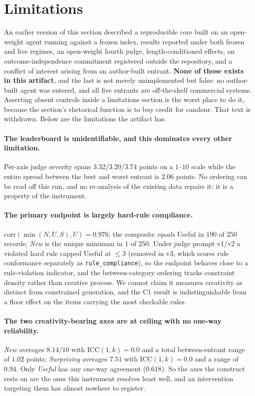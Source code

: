 \section{Limitations}
\label{sec:limitations}

An earlier version of this section described a reproducible core built on an open-weight agent
running against a frozen index, results reported under both frozen and live regimes, an open-weight
fourth judge, length-conditioned effects, an outcome-independence commitment registered outside the
repository, and a conflict of interest arising from an author-built entrant. \textbf{None of those
exists in this artifact}, and the last is not merely unimplemented but false: no author-built agent
was entered, and all five entrants are off-the-shelf commercial systems. Asserting absent controls
inside a limitations section is the worst place to do it, because the section's rhetorical function
is to buy credit for candour. That text is withdrawn. Below are the limitations the artifact has.

\paragraph{The leaderboard is unidentifiable, and this dominates every other limitation.} Per-axis
judge severity spans $3.32/3.20/3.74$ points on a $1$--$10$ scale while the entire spread between
the best and worst entrant is $2.06$ points. No ordering can be read off this run, and no
re-analysis of the existing data repairs it: it is a property of the instrument.

\paragraph{The primary endpoint is largely hard-rule compliance.} $\mathrm{corr}(\min(N,U,S),U) =
0.976$; the composite \emph{equals} Useful in $190$ of $250$ records; \emph{New} is the unique
minimum in $1$ of $250$. Under judge prompt v1/v2 a violated hard rule capped Useful at ${\leq}3$ (removed in v3, which scores rule conformance separately as \texttt{rule\_compliance}), so the endpoint behaves
close to a rule-violation indicator, and the between-category ordering tracks constraint density
rather than creative process. We cannot claim it measures creativity as distinct from constrained
generation, and the C1 result is indistinguishable from a floor effect on the items carrying the
most checkable rules.

\paragraph{The two creativity-bearing axes are at ceiling with no one-way reliability.} \emph{New}
averages $8.14/10$ with $\mathrm{ICC}(1,k)=0.0$ and a total between-entrant range of $1.02$ points;
\emph{Surprising} averages $7.51$ with $\mathrm{ICC}(1,k)=0.0$ and a range of $0.94$. Only
\emph{Useful} has any one-way agreement ($0.618$). So the axes the construct rests on are the ones
this instrument resolves least well, and an intervention targeting them has almost nowhere to
register.

